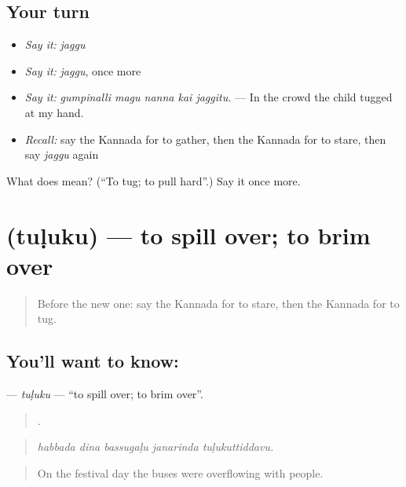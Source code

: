\subsection*{Your turn}
\begin{itemize}
\raggedright
  \item \emph{Say it:} \emph{jaggu}
  \item \emph{Say it:} \emph{jaggu}, once more
  \item \emph{Say it:} \emph{gumpinalli magu nanna kai jaggitu.} — In the crowd the child tugged at my hand.
  \item \emph{Recall:} say the Kannada for to gather, then the Kannada for to stare, then say \emph{jaggu} again
\end{itemize}

\begin{tcolorbox}[breakable,colback=teal!4,colframe=teal!35!black,title={Before you move on}]
What does  mean? (\textquotedblleft{}To tug; to pull hard\textquotedblright{}.) Say it once more.
\end{tcolorbox}
\section[\texorpdfstring{\kn{ತುಳುಕು} (tuḷuku)}{ತುಳುಕು (tuḷuku)}]{ (tuḷuku) — to spill over; to brim over}

\label{lesson:KA-C471-tuluku}



\begin{quote}
Before the new one: say the Kannada for to stare, then the Kannada for to tug.
\end{quote}

\subsection*{You'll want to know: }
\textbf{} — \emph{tuḷuku} — \textquotedblleft{}to spill over; to brim over\textquotedblright{}.

\begin{quote}
    .
\end{quote}

\begin{quote}
\emph{habbada dina bassugaḷu janarinda tuḷukuttiddavu.}
\end{quote}

\begin{quote}
On the festival day the buses were overflowing with people.
\end{quote}

